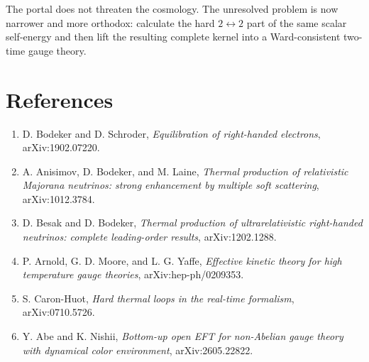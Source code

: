 \documentclass[
  10pt,
]{article}
\providecommand{\tightlist}{%
  \setlength{\itemsep}{0pt}\setlength{\parskip}{0pt}}
\begin{document}
The portal does not threaten the cosmology. The unresolved problem is
now narrower and more orthodox: calculate the hard \(2\leftrightarrow2\)
part of the same scalar self-energy and then lift the resulting complete
kernel into a Ward-consistent two-time gauge theory.

\section{References}\label{references}

\begin{enumerate}
\def\labelenumi{\arabic{enumi}.}
\tightlist
\item
  D. Bodeker and D. Schroder, \emph{Equilibration of right-handed
  electrons}, arXiv:1902.07220.
\item
  A. Anisimov, D. Bodeker, and M. Laine, \emph{Thermal production of
  relativistic Majorana neutrinos: strong enhancement by multiple soft
  scattering}, arXiv:1012.3784.
\item
  D. Besak and D. Bodeker, \emph{Thermal production of ultrarelativistic
  right-handed neutrinos: complete leading-order results},
  arXiv:1202.1288.
\item
  P. Arnold, G. D. Moore, and L. G. Yaffe, \emph{Effective kinetic
  theory for high temperature gauge theories}, arXiv:hep-ph/0209353.
\item
  S. Caron-Huot, \emph{Hard thermal loops in the real-time formalism},
  arXiv:0710.5726.
\item
  Y. Abe and K. Nishii, \emph{Bottom-up open EFT for non-Abelian gauge
  theory with dynamical color environment}, arXiv:2605.22822.
\end{enumerate}
\end{document}
